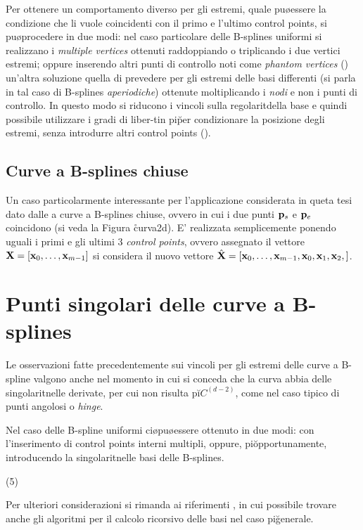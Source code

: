 Per ottenere un comportamento diverso per gli estremi, quale pu\o essere la condizione che li
vuole coincidenti con il primo e l'ultimo control points, si pu\o procedere in due modi:
\bi
\im nel caso particolare delle B-splines uniformi si realizzano i {\it multiple vertices}
    ottenuti raddoppiando o triplicando i due vertici estremi; oppure inserendo altri punti
    di controllo noti come {\it phantom vertices} (\cite{Bartels})
\im un'altra soluzione \e quella di prevedere per gli estremi delle basi differenti (si parla
    in tal caso di B-splines {\it aperiodiche}) ottenute moltiplicando i {\it nodi} e non
    i punti di controllo. In questo modo si riducono i vincoli sulla regolarit\a della base
    e quindi \e possibile utilizzare i gradi di liber-t\a in pi\u per condizionare la posizione
    degli estremi, senza introdurre altri control points (\cite{BlakeAC}).
\ei

\subsection{Curve a B-splines chiuse}

Un caso particolarmente interessante per l'applicazione considerata in queta tesi \e dato
dalle a curve a B-splines chiuse, ovvero in cui i due punti ${\bf p}_s$ e ${\bf p}_e$
coincidono (si veda la Figura \r{curva2d}).
E' realizzata semplicemente ponendo uguali i primi e gli ultimi $3$ {\it control points},
ovvero assegnato il vettore ${\bf X}=[{\bf x}_0,\dots,{\bf x}_{m-1}]$ si considera il nuovo
vettore $\hat{\bf X}=[{\bf x}_0,\dots,{\bf x}_{m-1},{\bf x}_0,{\bf x}_1,{\bf x}_2,]$.

\section{Punti singolari delle curve a B-splines}

Le osservazioni fatte precedentemente sui vincoli per gli estremi delle curve a B-spline
valgono anche nel momento in cui si conceda che la curva abbia delle singolarit\a nelle
derivate, per cui non risulta pi\u $C^{(d-2)}$, come nel caso tipico di punti angolosi o
{\it hinge}.

Nel caso delle B-spline uniformi ci\o pu\o essere ottenuto in due modi:
con l'inserimento di control points interni multipli\footnotemark, oppure, pi\u opportunamente,
introducendo la singolarit\a nelle basi delle B-splines. 


\vs(5)

Per ulteriori considerazioni si rimanda ai riferimenti \cite{BlakeAC}, \cite{Bartels}
in cui \e possibile trovare anche gli algoritmi per il calcolo ricorsivo delle basi
nel caso pi\u generale.

\finepar
